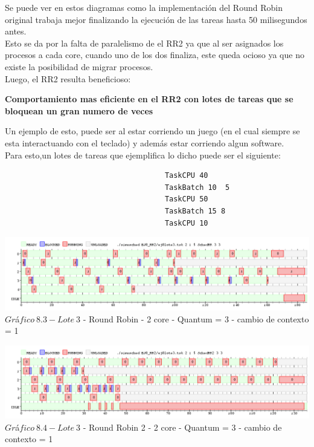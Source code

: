  Se puede ver en estos diagramas como la implementación del Round Robin original trabaja
 mejor finalizando la ejecución de las tareas hasta 50 milisegundos antes.\\
 Esto se da por la falta de paralelismo de el RR2 ya que al ser asignados los procesos
 a cada core, cuando uno de los dos finaliza, este queda ocioso ya que no existe la
 posibilidad de migrar  procesos.\\
 
 Luego, el RR2 resulta beneficioso:
 
 \textbf{Comportamiento mas eficiente en el RR2 con lotes de tareas que se bloquean un gran numero
de veces}

\indent Un ejemplo de esto, puede ser al estar corriendo un juego (en el cual siempre se esta interactuando con el teclado) y
adem\'{a}s estar corriendo algun software.\\

Para esto,un lotes de tareas que ejemplifica lo dicho puede ser el siguiente:\\

\begin{verbatim}
                                     TaskCPU 40
                                     TaskBatch 10  5
                                     TaskCPU 50
                                     TaskBatch 15 8
                                     TaskCPU 10

\end{verbatim}


   \begin{center}
    	\includegraphics[width=450pt]{./EJ8_RR2/dif5corerr.png}
	{$Gr$\'a$fico \ 8.3 - Lote \ 3$ - Round Robin - 2 core - Quantum = 3 - cambio de contexto = 1}	
 \end{center}
 
 \begin{center}
    	\includegraphics[width=450pt]{./EJ8_RR2/dif5corerr2.png}
	{$Gr$\'a$fico \ 8.4 - Lote \ 3$ - Round Robin 2 - 2 core - Quantum = 3 - cambio de contexto = 1}	
 \end{center}

